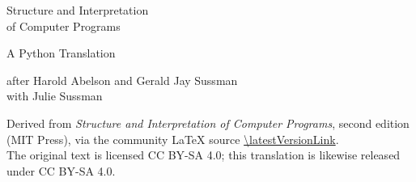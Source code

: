 %

\thispagestyle{empty}

\begin{center}
  \vspace*{6\baselineskip}

  {\huge\sffamily Structure and Interpretation\\[0.3\baselineskip]
   of Computer Programs\par}

  \vspace{1.5\baselineskip}
  {\Large\sffamily\color{MediumGray} A Python Translation\par}

  \vspace{3\baselineskip}
  {\large after Harold Abelson and Gerald Jay Sussman\\
   with Julie Sussman\par}

  \vfill

  {\footnotesize
   Derived from \emph{Structure and Interpretation of Computer Programs},
   second edition (MIT Press), via the community \LaTeX{} source
   \expandafter\url\expandafter{\latestVersionLink}.\\[0.5\baselineskip]
   The original text is licensed CC BY-SA 4.0;
   this translation is likewise released under CC BY-SA 4.0.\par}

  \vspace{2\baselineskip}
\end{center}

\cleardoublepage

\tableofcontents

